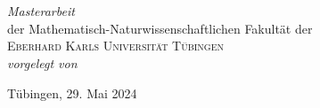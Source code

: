 \begin{titlepage}
  \vspace*{5cm}
  \makeatletter
  \begin{center}
    {
      \begin{Huge}
        \@title
      \end{Huge}\\[0.5cm]
    }
    \begin{Large}
      \@subtitle
    \end{Large}\\[1cm]
    \emph{Masterarbeit}\\[1cm]
    der Mathematisch-Naturwissenschaftlichen Fakultät der \\
    \textsc{Eberhard Karls Universität Tübingen} \\[1cm]
    \emph{vorgelegt von}\\[0.5cm]
    \begin{large}
      \@author
    \end{large}
    \vfill
    Tübingen, 29. Mai 2024
  \end{center}
  \makeatother
\end{titlepage}

\newpage
\null
\thispagestyle{empty}
\newpage
